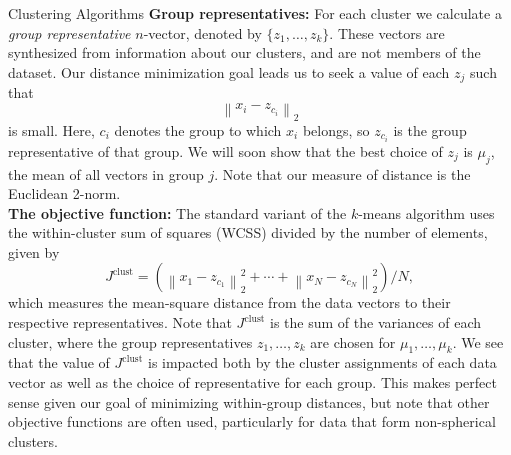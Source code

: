 \documentclass{article}
\newcommand{\norm}[2]{\left \lVert #1 \right \rVert_{#2}}
\begin{document}
\begin{section}{Clustering Algorithms}
\textbf{Group representatives:} For each cluster we calculate a \textit{group representative} $n$-vector, denoted by $\{z_{1},\ldots ,z_{k}\}$. These vectors are synthesized from information about our clusters, and are not members of the dataset. Our distance minimization goal leads us to seek a value of each $z_{j}$ such that
\[\norm{x_{i} - z_{c_{i}}}{2}\]
is small. Here, $c_{i}$ denotes the group to which $x_{i}$ belongs, so $z_{c_{i}}$ is the group representative of that group. We will soon show that the best choice of $z_j$ is $\mu_j$, the mean of all vectors in group $j$. Note that our measure of distance is the Euclidean 2-norm.\\

\textbf{The objective function:} The standard variant of the $k$-means algorithm uses the within-cluster sum of squares (WCSS) divided by the number of elements, given by
\begin{equation}
J^{\text{clust}}=\left(\norm{x_{1} - z_{c_{1}}}{2}^{2}+\cdots+\norm{x_{N} - z_{c_{N}}}{2}^{2}\right)/N,
\end{equation}
which measures the mean-square distance from the data vectors to their respective representatives. Note that $J^{\text{clust}}$ is the sum of the variances of each cluster, where the group representatives $z_{1},\ldots,z_{k}$ are chosen for $\mu_1,\ldots,\mu_k$. We see that the value of $J^{\text{clust}}$ is impacted both by the cluster assignments of each data vector as well as the choice of representative for each group. This makes perfect sense given our goal of minimizing within-group distances, but note that other objective functions are often used, particularly for data that form non-spherical clusters.
\end{section}
\end{document}
